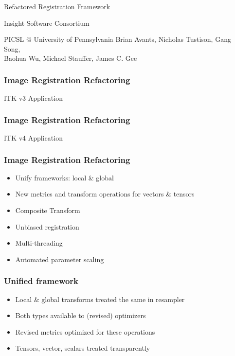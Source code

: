 {
\color{white}
\begin{frame}[plain]
\fontsize{36pt}{36pt}\selectfont
\center
\begin{center}
Refactored Registration Framework
\end{center}

\fontsize{12pt}{12pt}\selectfont
\begin{center}
Insight Software Consortium
\end{center}
\begin{center}
\newline
 PICSL @ University of Pennsylvania 
\newline
 Brian Avants, Nicholas Tustison, Gang Song, \\ 
Baohua Wu, Michael Stauffer, James C. Gee
\end{center}
\end{frame}
}




\begin{frame}
\frametitle{Image Registration Refactoring}
ITK v3 Application
\end{frame}

\begin{frame}
\frametitle{Image Registration Refactoring}
ITK v4 Application
\end{frame}


\begin{frame}
\frametitle{Image Registration Refactoring}
\Large
\begin{itemize}
\item Unify frameworks: local \& global 
\pause
\item New metrics and transform operations for vectors \&  tensors
\pause 
\item Composite Transform
\pause
\item Unbiased registration
\pause
\item Multi-threading 
\pause 
\item Automated parameter scaling
\end{itemize}
\end{frame}

\begin{frame}
\frametitle{Unified framework}
\Large
\begin{itemize}
\item Local \& global transforms treated the same in resampler
\item Both types available to (revised) optimizers
\item Revised metrics optimized for these operations
\item Tensors, vector, scalars treated transparently
\end{itemize}
\end{frame}


